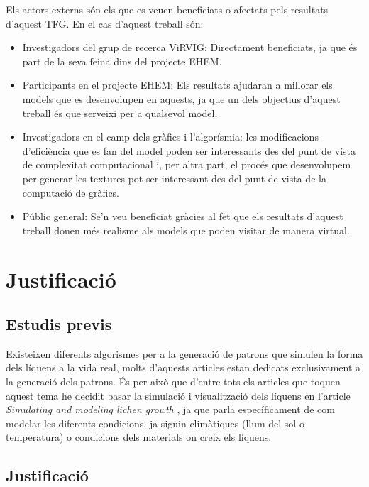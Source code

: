 \documentclass{article}
\begin{document}
Els actors externs són els que es veuen beneficiats o afectats pels resultats d'aquest TFG. En el cas d'aquest treball són:

\begin{itemize}
    \item Investigadors del grup de recerca ViRVIG: Directament beneficiats, ja que és part de la seva feina dins del projecte EHEM.
    \item Participants en el projecte EHEM: Els resultats ajudaran a millorar els models que es desenvolupen en aquests, ja que un dels objectius d'aquest treball és que serveixi per a qualsevol model.
    \item Investigadors en el camp dels gràfics i l'algorísmia: les modificacions d'eficiència que es fan del model poden ser interessants des del punt de vista de complexitat computacional i, per altra part, el procés que desenvolupem per generar les textures pot ser interessant des del punt de vista de la computació de gràfics.
    \item Públic general: Se'n veu beneficiat gràcies al fet que els resultats d'aquest treball donen més realisme als models que poden visitar de manera virtual.
\end{itemize}

\newpage

\section{Justificació}

\subsection{Estudis previs}

Existeixen diferents algorismes per a la generació de patrons que simulen la forma dels líquens a la vida real, molts d'aquests articles estan dedicats exclusivament a la generació dels patrons. És per això que d'entre tots els articles que toquen aquest tema he decidit basar la simulació i visualització dels líquens en l'article \textit{Simulating and modeling lichen growth} \cite{Simulating-and-modeling-lichen-growth}, ja que parla específicament de com modelar les diferents condicions, ja siguin climàtiques (llum del sol o temperatura) o condicions dels materials on creix els líquens.

\subsection{Justificació}
\end{document}
